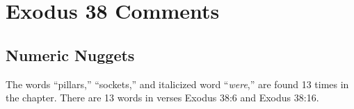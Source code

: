\section{Exodus 38 Comments}

\subsection{Numeric Nuggets}
The words ``pillars,'' ``sockets,'' and italicized word ``\emph{were},'' are found 13 times in the chapter. There are 13 words in verses Exodus 38:6 and Exodus 38:16.

